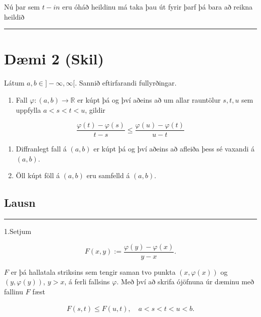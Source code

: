 \documentclass[]{book}
\providecommand{\tightlist}{%
  \setlength{\itemsep}{0pt}\setlength{\parskip}{0pt}}
\begin{document}
Nú þar sem \(t-in\) eru óháð heildinu má taka þau út fyrir þarf þá bara að reikna heildið

\begin{center}\rule{0.5\linewidth}{\linethickness}\end{center}

\hypertarget{dmi-2-skil}{%
\section*{Dæmi 2 (Skil)}\label{dmi-2-skil}}

Látum \(a,b\in]-\infty, \infty[\). Sannið eftirfarandi fullyrðingar.

\begin{enumerate}
\def\labelenumi{\arabic{enumi}.}
\tightlist
\item
  Fall \(\varphi:(a,b)\rightarrow\mathbb R\) er kúpt þá og því aðeins að um allar rauntölur \(s,t,u\) sem uppfylla \(a<s<t<u\), gildir
\end{enumerate}

\[
\frac{\varphi(t) - \varphi(s)}{t - s}\leq \frac{\varphi(u) - \varphi(t)}{u - t}
\]

\begin{enumerate}
\def\labelenumi{\arabic{enumi}.}
\setcounter{enumi}{1}
\item
  Diffranlegt fall á \((a,b)\) er kúpt þá og því aðeins að afleiða þess sé vaxandi á \((a,b)\).
\item
  Öll kúpt föll á \((a,b)\) eru samfelld á \((a,b)\).
\end{enumerate}

\hypertarget{lausn-2}{%
\subsection*{Lausn}\label{lausn-2}}

\begin{center}\rule{0.5\linewidth}{\linethickness}\end{center}

1.Setjum

\[
F(x, y) := \frac{\varphi(y) - \varphi(x)}{y - x}.
\]

\(F\) er þá hallatala striksins sem tengir saman tvo punkta \((x, \varphi(x))\) og \((y, \varphi(y))\), \(y>x\), á ferli fallsins \(\varphi\). Með því að skrifa ójöfnuna úr dæminu með fallinu \(F\) fæst

\[
\begin{aligned}
F(s, t) \leq F(u, t), \quad a<s<t<u<b.
\end{aligned}
\]
\end{document}
